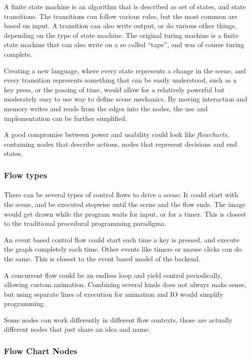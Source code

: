 A finite state machine is an algorithm that is described as set of states, and state transitions. The transitions can follow various rules, but the most common are based on input. A transition can also write output, or do various other things, depending on the type of state machine.
The original turing machine is a finite state machine that can also write on a so called ``tape'', and was of course turing complete.

Creating a new language, where every state represents a change in the scene, and every transition represents something that can be easily understood, such as a key press, or the passing of time, would allow for a relatively powerful but moderately easy to use way to define scene mechanics.
By moving interaction and memory writes and reads from the edges into the nodes, the use and implementation can be further simplified.

A good compromise between power and usability could look like \textit{flowcharts}, containing nodes that describe actions, nodes that represent decisions and end states.

\subsubsection{Flow types}
\paragraph{}
There can be several types of control flows to drive a scene:
It could start with the scene, and be executed stepwise until the scene and the flow ends.
The image would get drawn while the program waits for input, or for a timer.
This is closest to the traditional procedural programming paradigma.

An event based control flow could start each time a key is pressed, and execute the graph completely each time.
Other events like timers or mouse clicks can do the same.
This is closest to the event based model of the backend.

A concurrent flow could be an endless loop and yield control periodically, allowing custom animation.
Combining several kinds does not always make sense, but using separate lines of execution for animation and IO would simplify programming.

Some nodes can work differently in different flow contexts, those are actually different nodes that just share an idea and name.

\subsubsection{Flow Chart Nodes}
